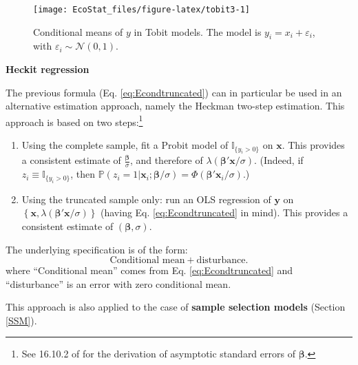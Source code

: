 \documentclass[
  12pt,
]{book}
\theoremstyle{definition}
\theoremstyle{definition}
\theoremstyle{definition}
\theoremstyle{definition}
\theoremstyle{remark}
\begin{document}
\begin{figure}
\texttt{[image: EcoStat\_files/figure-latex/tobit3-1]} \caption{Conditional means of $y$ in Tobit models. The model is $y_i = x_i + \varepsilon_i$, with $\varepsilon_i \sim \mathcal{N}(0,1)$.}\label{fig:tobit3}
\end{figure}

\textbf{Heckit regression}

The previous formula (Eq. \eqref{eq:Econdtruncated}) can in particular be used in an alternative estimation approach, namely the Heckman two-step estimation. This approach is based on two steps:\footnote{See 16.10.2 of \citet{Cameron_Trivedi_2005} for the derivation of asymptotic standard errors of \(\boldsymbol\beta\).}

\begin{enumerate}
\def\labelenumi{\arabic{enumi}.}
\item
  Using the complete sample, fit a Probit model of \(\mathbb{I}_{\{y_i>0\}}\) on \(\mathbf{x}\). This provides a consistent estimate of \(\frac{\boldsymbol\beta}{\sigma}\), and therefore of \(\lambda(\boldsymbol\beta'\mathbf{x}/\sigma)\). (Indeed, if \(z_i \equiv \mathbb{I}_{\{y_i>0\}}\), then \(\mathbb{P}(z_i=1|\mathbf{x}_i;\boldsymbol\beta/\sigma)=\Phi(\boldsymbol\beta'\mathbf{x}_i/\sigma)\).)
\item
  Using the truncated sample only: run an OLS regression of \(\mathbf{y}\) on \(\left\{\mathbf{x},\lambda(\boldsymbol\beta'\mathbf{x}/\sigma)\right\}\) (having Eq. \eqref{eq:Econdtruncated} in mind). This provides a consistent estimate of \((\boldsymbol\beta,\sigma)\).
\end{enumerate}

The underlying specification is of the form:
\[
\mbox{Conditional mean} + \mbox{disturbance}.
\]
where ``Conditional mean'' comes from Eq. \eqref{eq:Econdtruncated} and ``disturbance'' is an error with zero conditional mean.

This approach is also applied to the case of \textbf{sample selection models} (Section \ref{SSM}).
\end{document}
